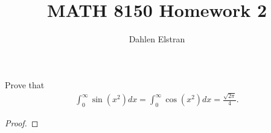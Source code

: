 \documentclass[12pt]{article}
\newenvironment{statement}[2][Statement]{\begin{trivlist}
\item[\hskip \labelsep {\bfseries #1}\hskip \labelsep {\bfseries #2.}]}{\end{trivlist}}
\begin{document}
 
\title{MATH 8150 Homework 2} 
\author{Dahlen Elstran} 
\maketitle

\begin{statement}[Problem]{1}
  Prove that 
  \begin{align*}
    \int^{\infty}_0 \sin(x^2)dx=\int^{\infty}_0 \cos(x^2)dx=\frac{\sqrt{2\pi}}{4}.
  \end{align*}
\end{statement}
\begin{proof}

\end{proof}
\end{document}
